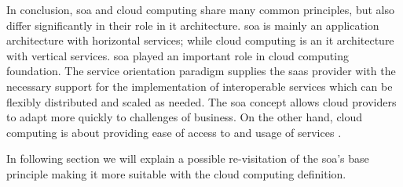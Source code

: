 In conclusion, \ac{soa} and cloud computing share many common principles, but also differ significantly
in their role in \acs{it} architecture. \ac{soa} is mainly an application architecture with horizontal
services; while cloud computing is an \acs{it} architecture with vertical services. \ac{soa} played an
important role in cloud computing foundation. The service orientation paradigm supplies the \ac{saas}
provider with the necessary support for the implementation of interoperable services which can be flexibly
distributed and scaled as needed. The \ac{soa} concept allows cloud providers to adapt more quickly to
challenges of business. On the other hand, cloud computing is about providing ease of access to and usage of
services \cite{zuccato2014implementing}.

In following section we will explain a possible re-visitation of the \ac{soa}'s base principle making it more
suitable with the cloud computing definition.
